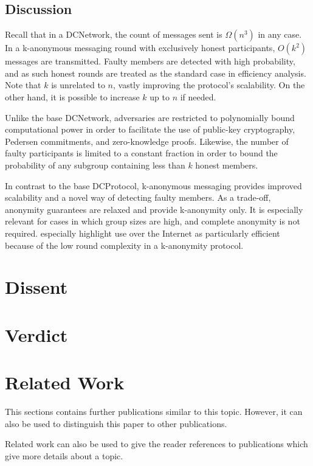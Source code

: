 \subsection{Discussion}

Recall that in a \ac{DCNetwork}, the count of messages sent is $\Omega(n^3)$ in any case.
In a k-anonymous messaging round with exclusively honest participants, $O(k^2)$ messages are transmitted.
Faulty members are detected with high probability, and as such
honest rounds are treated as the standard case in efficiency analysis.
Note that $k$ is unrelated to $n$, vastly improving the protocol's scalability.
On the other hand, it is possible to increase $k$ up to $n$ if needed.

Unlike the base \ac{DCNetwork}, adversaries are restricted to polynomially bound computational
power in order to facilitate the use of public-key cryptography, Pedersen commitments, and zero-knowledge
proofs. Likewise, the number of faulty participants is limited to a constant fraction in order
to bound the probability of any subgroup containing less than $k$ honest members.

In contrast to the base \ac{DCProtocol}, k-anonymous messaging provides improved scalability and
a novel way of detecting faulty members. As a trade-off, anonymity guarantees are relaxed
and provide k-anonymity only. It is especially relevant for cases in which group sizes are high,
and complete anonymity is not required. \citeauthor{von2003k} especially highlight use over the
Internet as particularly efficient because of the low round complexity in a k-anonymity protocol.

\section{Dissent}



\section{Verdict}

\section{Related Work}

This sections contains further publications similar to this topic. However, it can also be used to distinguish this paper to other publications.

Related work can also be used to give the reader references to publications which give more details about a topic.

